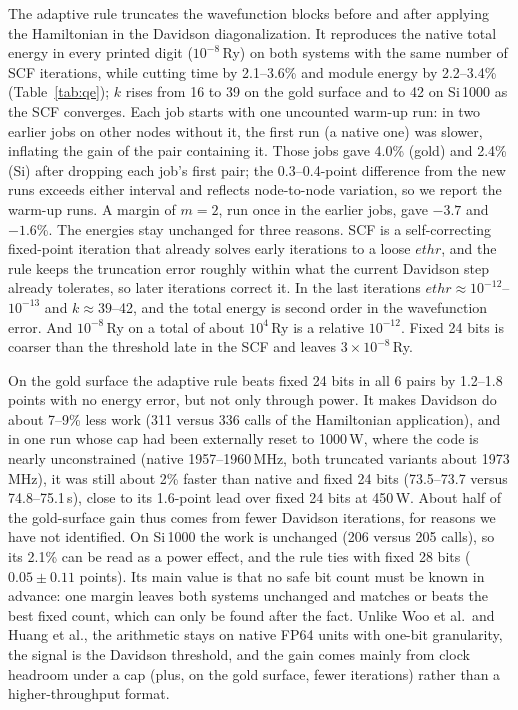 \documentclass[conference]{IEEEtran}
\newcommand{\W}{\,W}
\newcommand{\Ry}{\,Ry}
\newcommand{\ee}[2]{#1{\times}10^{#2}}  %
\newcommand{\pct}{\%}
\begin{document}
The adaptive rule truncates the wavefunction blocks before and after applying the Hamiltonian in the Davidson
diagonalization. It reproduces the native total energy in every printed digit ($10^{-8}$\Ry) on both systems with
the same number of SCF iterations, while cutting time by 2.1--3.6\pct{} and module energy by 2.2--3.4\pct{}
(Table~\ref{tab:qe}); $k$ rises from 16 to 39 on the gold surface and to 42 on Si\,1000 as the SCF converges. Each job starts with one
uncounted warm-up run: in two earlier jobs on other nodes without it, the first run (a native one) was
slower, inflating the gain of the pair containing it. Those jobs gave 4.0\pct{} (gold) and 2.4\pct{} (Si) after
dropping each job's first pair; the 0.3--0.4-point difference from the new runs exceeds either interval and reflects
node-to-node variation, so we report the warm-up runs. A margin of $m=2$, run once in the earlier jobs, gave
$-3.7$ and $-1.6\pct$. The energies stay unchanged for three
reasons. SCF is a self-correcting fixed-point iteration that already solves early iterations to a loose
$\mathit{ethr}$, and the rule keeps the truncation error roughly within what the current Davidson step already
tolerates, so later iterations correct it. In the last iterations $\mathit{ethr}\approx10^{-12}$--$10^{-13}$ and $k\approx39$--42,
and the total energy is second order in the wavefunction error. And $10^{-8}$\Ry{} on a total of about $10^4$\Ry{}
is a relative $10^{-12}$. Fixed 24 bits is coarser than the threshold late in the SCF and leaves $\ee{3}{-8}$\Ry.

On the gold surface the adaptive rule beats fixed 24 bits in all 6 pairs by 1.2--1.8 points with no energy error,
but not only through power. It makes Davidson do about 7--9\pct{} less work (311 versus 336 calls of the
Hamiltonian application), and in one run whose cap had been externally reset to 1000\W, where the code is nearly unconstrained (native 1957--1960\,MHz,
both truncated variants about 1973\,MHz), it was still about 2\pct{} faster than native and fixed 24 bits (73.5--73.7 versus
74.8--75.1\,s), close to its 1.6-point lead over fixed 24 bits at 450\W. About half of the gold-surface gain thus comes from fewer Davidson iterations, for reasons we have
not identified. On Si\,1000 the work is unchanged (206 versus 205 calls), so its 2.1\pct{} can be read as a power
effect, and the rule ties with fixed 28 bits ($0.05\pm0.11$ points). Its main value is that no
safe bit count must be known in advance: one margin leaves both systems unchanged and matches or beats the best
fixed count, which can only be found after the fact. Unlike Woo et al.\ and Huang et al., the arithmetic stays on
native FP64 units with one-bit granularity, the signal is the Davidson threshold, and the gain comes mainly from
clock headroom under a cap (plus, on the gold surface, fewer iterations) rather than a higher-throughput format.
\end{document}
